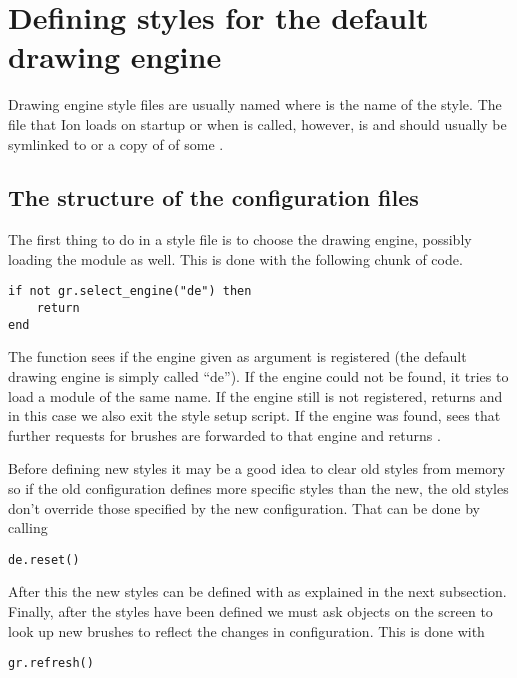 \section{Defining styles for the default drawing engine}
\label{sec:defaultde}

Drawing engine style files are usually named
 where  is the name of the
style. The file that Ion loads on startup or when
 is called, however, is 
and should usually be symlinked to or a copy of of some
.

\subsection{The structure of the configuration files}

The first thing to do in a style file is to choose the drawing
engine, possibly loading the module as well. This is done
with the following chunk of code.

\begin{verbatim}
if not gr.select_engine("de") then 
    return 
end
\end{verbatim}

The  function sees if the engine
given as argument is registered (the default drawing engine is
simply called ``de''). If the engine could not be found, it
tries to load a module of the same name. If the engine still
is not registered,  returns 
and in this case we also exit the style setup script.
If the engine was found,  sees that
further requests for brushes are forwarded to that engine
and returns .

Before defining new styles it may be a good idea to clear old
styles from memory so if the old configuration defines more
specific styles than the new, the old styles don't override 
those specified by the new configuration. That can be done by
calling

\begin{verbatim}
de.reset()
\end{verbatim}

After this the new styles can be defined with 
as explained in the next subsection. Finally, after the styles have
been defined we must ask objects on the screen to look up new brushes
to reflect the changes in configuration. This is done with

\begin{verbatim}
gr.refresh()
\end{verbatim}


